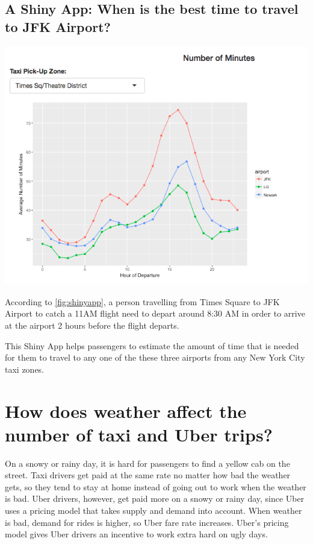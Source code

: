 \documentclass[12pt,twoside]{reedthesis}
\theoremstyle{definition}
\theoremstyle{definition}
\theoremstyle{definition}
\theoremstyle{remark}
\begin{document}
\subsection{A Shiny App: When is the best time to travel to JFK
Airport?}\label{a-shiny-app-when-is-the-best-time-to-travel-to-jfk-airport}
\begin{center}\includegraphics[width=6.74in]{figure/shinyapp} \end{center}

According to \ref{fig:shinyapp}, a person travelling from Times Square
to JFK Airport to catch a 11AM flight need to depart around 8:30 AM in
order to arrive at the airport 2 hours before the flight departs.

This Shiny App helps passengers to estimate the amount of time that is
needed for them to travel to any one of the these three airports from
any New York City taxi zones.

\section{How does weather affect the number of taxi and Uber
trips?}\label{how-does-weather-affect-the-number-of-taxi-and-uber-trips}

On a snowy or rainy day, it is hard for passengers to find a yellow cab
on the street. Taxi drivers get paid at the same rate no matter how bad
the weather gets, so they tend to stay at home instead of going out to
work when the weather is bad. Uber drivers, however, get paid more on a
snowy or rainy day, since Uber uses a pricing model that takes supply
and demand into account. When weather is bad, demand for rides is
higher, so Uber fare rate increases. Uber's pricing model gives Uber
drivers an incentive to work extra hard on ugly days.
\end{document}
